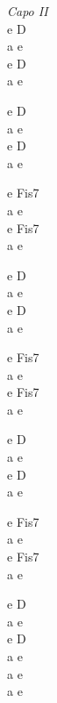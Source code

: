 \begin{chord}
\textit{Capo II}\\
e D\\
a e\\
e D\\
a e

e D\\
a e\\
e D\\
a e

e Fis7\\
a e\\
e Fis7\\
a e

e D\\
a e\\
e D\\
a e

e Fis7\\
a e\\
e Fis7\\
a e

e D\\
a e\\
e D\\
a e

e Fis7\\
a e\\
e Fis7\\
a e

e D\\
a e\\
e D\\
a e\\
a e\\
a e
\end{chord}